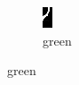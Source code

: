 \begin{figure}
  \begin{subfigure}[c]{0.1\textwidth}
        \includegraphics[width=\textwidth]{5d.jpg}
        \caption{green}

\end{subfigure}
\end{figure}
